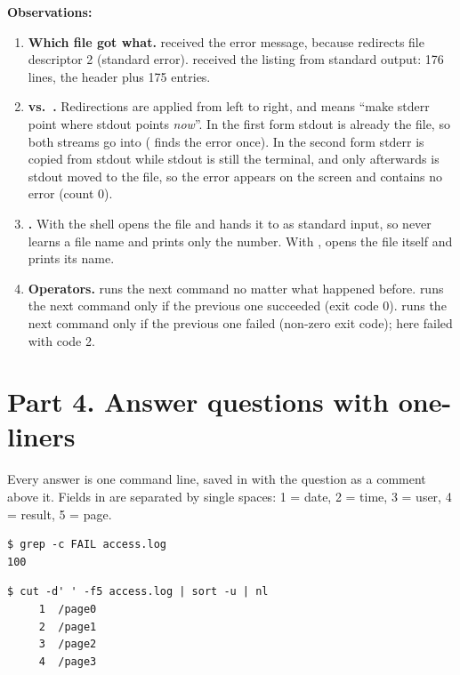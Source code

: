 \documentclass[11pt,a4paper]{article}
\begin{document}
\textbf{Observations:}
\begin{enumerate}
  \item \textbf{Which file got what.}  received the error message, because
   redirects file descriptor 2 (standard error).  received the listing
  from standard output: 176 lines, the  header plus 175 entries.
  \item \textbf{ vs.\ .} Redirections are applied
  from left to right, and  means ``make stderr point where stdout points
  \emph{now}''. In the first form stdout is already the file, so both streams go into
   ( finds the error once). In the second form stderr is copied
  from stdout while stdout is still the terminal, and only afterwards is stdout moved to the
  file, so the error appears on the screen and  contains no error (count 0).
  \item \textbf{.} With \code{<} the shell opens the file and hands
  it to  as standard input, so  never learns a file name and prints only the
  number. With ,  opens the file itself and prints its name.
  \item \textbf{Operators.} \code{;} runs the next command no matter what happened before.
  \code{\&\&} runs the next command only if the previous one succeeded (exit code 0).
  \code{||} runs the next command only if the previous one failed (non-zero exit code); here
   failed with code 2.
\end{enumerate}

\section{Part 4. Answer questions with one-liners}

Every answer is one command line, saved in  with the question as a comment
above it. Fields in  are separated by single spaces: 1 = date, 2 = time,
3 = user, 4 = result, 5 = page.

\begin{lstlisting}[caption={Number of failed requests}]
$ grep -c FAIL access.log
100
\end{lstlisting}

\begin{lstlisting}[caption={Different pages requested}]
$ cut -d' ' -f5 access.log | sort -u | nl
     1  /page0
     2  /page1
     3  /page2
     4  /page3
\end{lstlisting}
\end{document}
